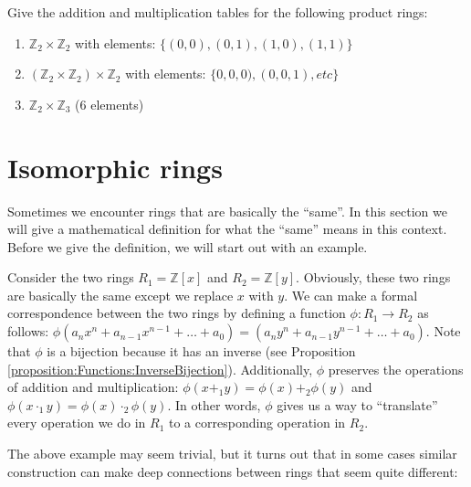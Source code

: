 \begin{exercise}{}
Give the addition and multiplication tables for the following product rings:
\begin{enumerate}
\item ${\mathbb Z}_2\times {\mathbb Z}_2$ with elements: $\{(0,0),(0,1),(1,0),(1,1)\}$ 
\item $({\mathbb Z}_2\times {\mathbb Z}_2)\times {\mathbb Z}_2$ with elements: $\{0,0,0),(0,0,1),etc\}$
\item ${\mathbb Z}_2\times {\mathbb Z}_3$ (6 elements)
\end{enumerate}
\end{exercise}

\section{Isomorphic rings}
\label{sec:Rings:IsomorphicRings}

Sometimes we encounter rings that are basically the ``same''.  In this section we will give a mathematical definition for what the ``same'' means in this context.  Before we give the definition, we will start out with an example.

\begin{example}{}
Consider the two rings $R_1={\mathbb Z}[x]$ and $R_2={\mathbb Z}[y]$.  Obviously, these two rings are basically the same except we replace $x$ with $y$.  We can make a formal correspondence between the two rings by defining a function $\phi:R_1\rightarrow R_2$ as follows: $\phi(a_nx^n+a_{n-1}x^{n-1}+\ldots +a_0)=(a_ny^n+a_{n-1}y^{n-1}+\ldots +a_0)$.  Note that $\phi$ is a bijection because it has an inverse (see Proposition \ref{proposition:Functions:InverseBijection}).  Additionally, $\phi$ preserves the operations of addition and multiplication:  $\phi(x+_1y)=\phi(x)+_2\phi(y)$ and
$\phi(x\cdot_1y)=\phi(x)\cdot_2\phi(y)$.  In other words, $\phi$ gives us a way to ``translate'' every operation we do in $R_1$ to a corresponding operation in $R_2$.
\end{example}
The above example may seem trivial, but it turns out that in some cases similar construction can make deep connections between rings that seem quite different:

